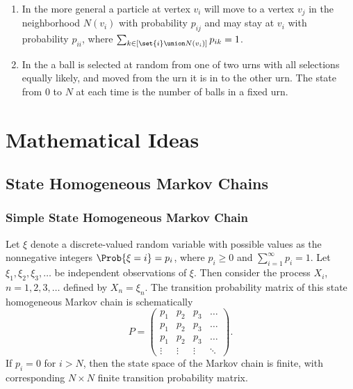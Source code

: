\documentclass[12pt]{article}
\begin{document}
\begin{enumerate}
        A  is a finite or infinite set of nodes, also called
        vertices, \( \set{v_1, v_2, \dots, v_n} \), and an associated
        collection of edges \( \set{v_{ij}, 1 \le i,j \le n} \).  There
        need not be an edge between any two vertices, but if there is a
        connection between vertices \( v_i \) and \( v_j \), then \( v_j
        \) is in the neighborhood \( N(v_i) \) of \( v_i \).
    \item
        In the more general  a particle at
        vertex \( v_i \) will move to a vertex \( v_j \) in the
        neighborhood \( N(v_i) \) with probability \( p_{ij} \) and may
        stay at \( v_i \) with probability \( p_{ii} \), where \( \sum_
        {k \in [\set{i} \union N(v_i)]} p_{ik} = 1 \).
    \item
        In the  a ball is selected at random
        from one of two urns with all selections equally likely, and moved from
        the urn it is in to the other urn.  The state from \( 0 \) to
        \( N \) at each time is
        the number of balls in a fixed urn.
\end{enumerate}

\hr

\section*{Mathematical Ideas}

\subsection*{State Homogeneous Markov Chains}

\subsubsection*{Simple State Homogeneous Markov Chain}

Let \( \xi \) denote a discrete-valued random variable with possible
values as the nonnegative integers \( \Prob{\xi=i} = p_i \), where \( p_i
\ge 0 \) and \( \sum_{i=1}^{\infty} p_i = 1 \).  Let \( \xi_1, \xi_2,
\xi_3, \dots \) be independent observations of \( \xi \).  Then consider
the process \( X_i \), \( n = 1, 2, 3, \dots \) defined by \( X_n = \xi_n
\).  The transition probability matrix of this state homogeneous Markov
chain is schematically%
\[
    P =
    \begin{pmatrix}
        p_1 & p_2 & p_3 & \dots \\
        p_1 & p_2 & p_3 & \dots \\
        p_1 & p_2 & p_3 & \dots \\
        \vdots & \vdots & \vdots & \ddots
    \end{pmatrix}
    .
\] If \( p_i = 0 \) for \( i > N \), then the state space of the Markov
chain is finite, with corresponding \( N \times N \) finite transition
probability matrix.
\end{document}
